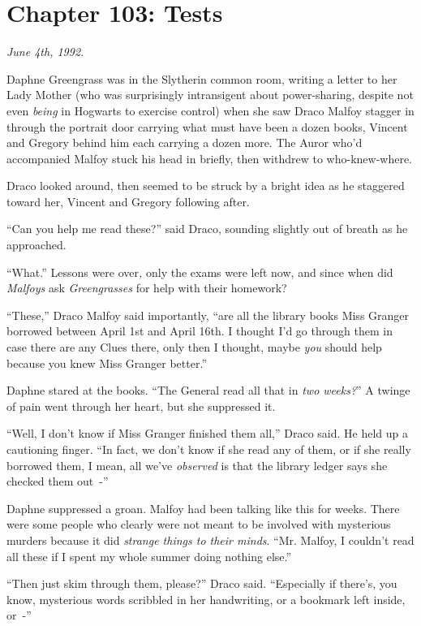 \chapter{Chapter 103: Tests}
\emph{June 4th, 1992.}

Daphne Greengrass was in the Slytherin common room, writing a letter to her Lady Mother (who was surprisingly intransigent about power-sharing, despite not even \emph{being} in Hogwarts to exercise control) when she saw Draco Malfoy stagger in through the portrait door carrying what must have been a dozen books, Vincent and Gregory behind him each carrying a dozen more. The Auror who'd accompanied Malfoy stuck his head in briefly, then withdrew to who-knew-where.

Draco looked around, then seemed to be struck by a bright idea as he staggered toward her, Vincent and Gregory following after.

``Can you help me read these?'' said Draco, sounding slightly out of breath as he approached.

``What.'' Lessons were over\emph{,} only the exams were left now, and since when did \emph{Malfoys} ask \emph{Greengrasses} for help with their homework?

``These,'' Draco Malfoy said importantly, ``are all the library books Miss Granger borrowed between April 1st and April 16th. I thought I'd go through them in case there are any Clues there, only then I thought, maybe \emph{you} should help because you knew Miss Granger better.''

Daphne stared at the books. ``The General read all that in \emph{two weeks?}'' A twinge of pain went through her heart, but she suppressed it.

``Well, I don't know if Miss Granger finished them all,'' Draco said. He held up a cautioning finger. ``In fact, we don't know if she read any of them, or if she really borrowed them, I mean, all we've \emph{observed} is that the library ledger says she checked them out~-''

Daphne suppressed a groan. Malfoy had been talking like this for weeks. There were some people who clearly were not meant to be involved with mysterious murders because it did \emph{strange things to their minds}. ``Mr. Malfoy, I couldn't read all these if I spent my whole summer doing nothing else.''

``Then just skim through them, please?'' Draco said. ``Especially if there's, you know, mysterious words scribbled in her handwriting, or a bookmark left inside, or~-''

